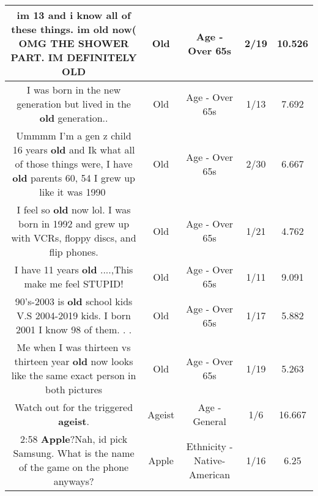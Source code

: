 \documentclass[11pt]{article}
\newlength\mylength
\begin{document}
\begin{center}
\begin{longtable}{|C{.65\mylength}|C{.30\mylength}|C{.12\mylength}|C{.12\mylength}|C{.12\mylength}|}
  \small im 13 and i know all of these things. im \textbf{old} now( OMG THE SHOWER PART. IM DEFINITELY OLD\normalsize   & Old & Age - Over 65s & 2/19 & 10.526 \\  \hline
  \small I was born in the new generation but lived in the \textbf{old} generation..\normalsize   & Old & Age - Over 65s & 1/13 & 7.692 \\  \hline
  \small Ummmm I'm a gen z child 16 years \textbf{old} and Ik what all of those things were, I have \textbf{old} parents 60, 54 I grew up like it was 1990🤣\normalsize   & Old & Age - Over 65s & 2/30 & 6.667 \\  \hline
  \small I feel so \textbf{old} now lol. I was born in 1992 and grew up with VCRs, floppy discs, and flip phones.\normalsize   & Old & Age - Over 65s & 1/21 & 4.762 \\  \hline
  \small I have 11 years \textbf{old} ....,This make me feel STUPID!\normalsize   & Old & Age - Over 65s & 1/11 & 9.091 \\  \hline
  \small 90's-2003 is \textbf{old} school kids V.S 2004-2019 kids. I born 2001 I know 98 of them. . .\normalsize   & Old & Age - Over 65s & 1/17 & 5.882 \\  \hline
  \small Me when I was thirteen vs thirteen year \textbf{old} now looks like the same exact person in both pictures\normalsize   & Old & Age - Over 65s & 1/19 & 5.263 \\  \hline
  \small Watch out for the triggered \textbf{ageist}.\normalsize   & Ageist & Age - General & 1/6 & 16.667 \\  \hline
  \small 2:58 \textbf{Apple}?Nah, id pick Samsung. What is the name of the game on the phone anyways?\normalsize   & Apple & Ethnicity - Native-American & 1/16 & 6.25 \\  \hline

\end{longtable}
\end{center}
\end{document}
